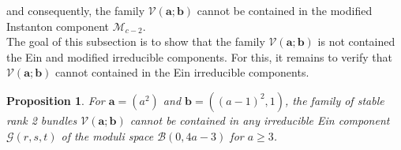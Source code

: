 \documentclass[twoside,reqno]{amsart}
\theoremstyle{plain}
\newtheorem{proposition}[theorem]{Proposition}
\begin{document}
and consequently, the family $\mathcal{V}(\boldsymbol{a};\boldsymbol{b})$ cannot be contained in the modified 
Instanton component $\mathcal{M}_{c-2}$.\\
\indent The goal of this subsection is to 
show that the family $\mathcal{V}(\boldsymbol{a};\boldsymbol{b})$ is not contained the Ein and modified irreducible components. For this, it remains to verify that 
$\mathcal{V}(\boldsymbol{a};\boldsymbol{b})$ cannot contained in the Ein irreducible components.  
%
%
\begin{proposition}\label{prop-dim3}
For $\boldsymbol{a}=(a^2)$ and 
$\boldsymbol{b}=({(a-1)}^2,1)$, the family of stable rank 2 bundles $\mathcal{V}(\boldsymbol{a};\boldsymbol{b})$ 
cannot be contained in any irreducible Ein component $\mathcal{G}(r,s,t)$ of the moduli 
space $\mathcal{B}(0,4a-3)$ for $a\geq3$.
 \end{proposition}
\end{document}
